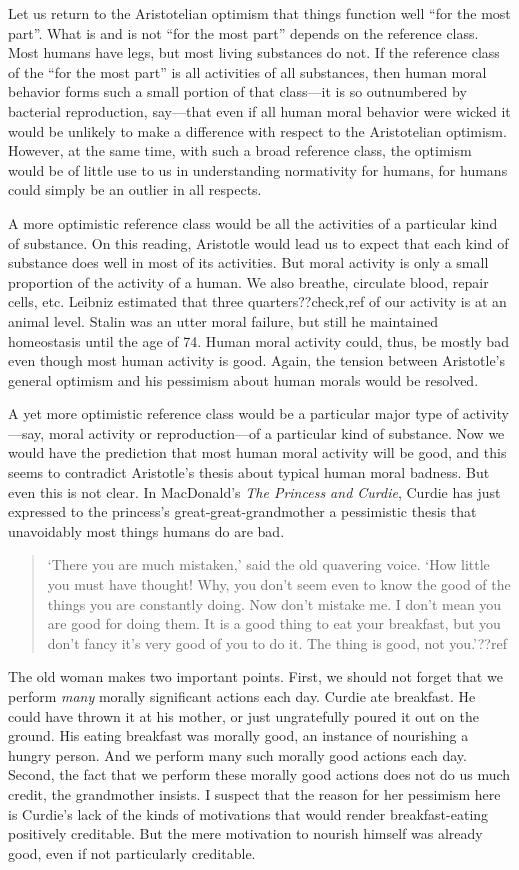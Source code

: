 Let us return to the Aristotelian optimism that things function well ``for the most part''. What is and is not
``for the most part'' depends on the reference class. Most humans have legs, but most living substances do not. 
If the reference class of the ``for the most part'' is all activities of all substances, then human moral behavior
forms such a small portion of that class---it is so outnumbered by bacterial reproduction, say---that even if 
all human moral behavior were wicked it would be unlikely to make a difference with respect to the Aristotelian
optimism. However, at the same time, with such a broad reference class, the optimism would be of little use to us
in understanding normativity for humans, for humans could simply be an outlier in all respects. 

A more optimistic reference class would be all the activities of a particular kind of substance. On this reading, 
Aristotle would lead us to expect that each kind of substance does well in most of its activities. But moral activity
is only a small proportion of the activity of a human. We also breathe, circulate blood, repair cells, etc. Leibniz 
estimated that three quarters??check,ref of our activity is at an animal level. Stalin was an utter moral failure, but
still he maintained homeostasis until the age of 74. Human moral activity could, thus, be mostly bad even though most
human activity is good. Again, the tension between Aristotle's general optimism and his pessimism about human morals
would be resolved.

A yet more optimistic reference class would be a particular major type of activity---say, moral activity or reproduction---of
a particular kind of substance. Now we would have the prediction that most human moral activity will be good, and this seems
to contradict Aristotle's thesis about typical human moral badness. But even this is not clear. In MacDonald's 
\textit{The Princess and Curdie}, Curdie has just expressed to the princess's great-great-grandmother a pessimistic thesis that 
unavoidably most things humans do are bad. 
\begin{quote}
`There you are much mistaken,' said the old quavering voice. `How little you must have thought! Why, you don't seem even to 
know the good of the things you are constantly doing. Now don't mistake me. I don't mean you are good for doing them. 
It is a good thing to eat your breakfast, but you don't fancy it's very good of you to do it. The thing is good, not you.'??ref
\end{quote}
The old woman makes two important points. First, we should not forget that we perform \textit{many} morally significant actions
each day. Curdie ate breakfast. He could have thrown it at his mother, or just ungratefully poured it out on the ground.
His eating breakfast was morally good, an instance of nourishing a hungry person. And we perform many such morally good actions each day. Second, the fact that we
perform these morally good actions does not do us much credit, the grandmother insists. I suspect that the reason for her
pessimism here is Curdie's lack of the kinds of motivations that would render breakfast-eating positively creditable.
But the mere motivation to nourish himself was already good, even if not particularly creditable.

